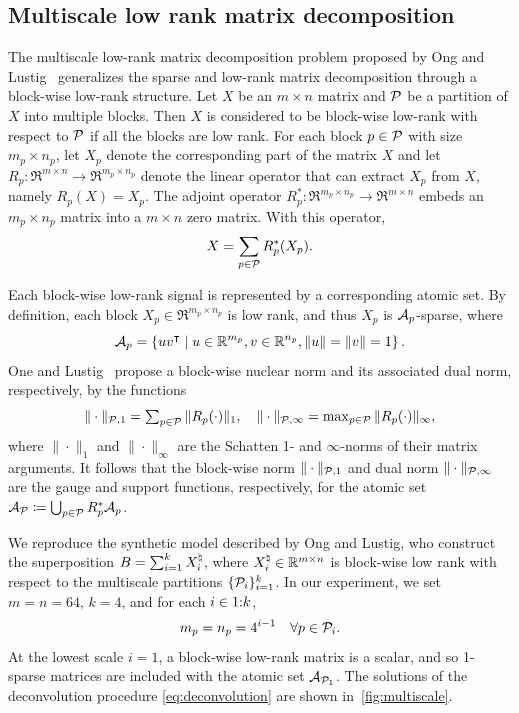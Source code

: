 \subsection{Multiscale low rank matrix decomposition} \label{sec:6.4}

The multiscale low-rank matrix decomposition problem proposed by Ong and Lustig~\cite{ong2016beyond} generalizes the sparse and low-rank matrix decomposition through a block-wise low-rank structure. Let $X$ be an $m \times n$ matrix and $\mathcal{P}$ be a partition of $X$ into multiple blocks. Then $X$ is considered to be block-wise low-rank with respect to $\mathcal{P}$ if all the blocks are low rank. For each block $p\in\mathcal{P}$ with size $m_p \times n_p$, let $X_p$ denote the corresponding part of the matrix $X$ and let $R_p: \Re^{m \times n} \to \Re^{m_p \times n_p}$ denote the linear operator that can extract $X_p$ from $X$, namely $R_p(X) = X_p$. The adjoint operator $R_p^*: \Re^{m_p \times n_p} \to \Re^{m \times n}$ embeds an $m_p \times n_p$ matrix into a $m \times n$ zero matrix. With this operator, 
\begin{equation*}
  X = \sum\limits_{p \in \mathcal{P}} R_p^*(X_p).
\end{equation*}

Each block-wise low-rank signal is represented by a corresponding atomic set. By definition, each block $X_p \in \Re^{m_p \times n_p}$ is low rank, and thus $X_p$ is $\mathcal{A}_p$-sparse, where 
\[
  \mathcal{A}_p = \left\{uv^\intercal \mid u \in \mathbb{R}^{m_p}, v \in \mathbb{R}^{n_p}, \|u\| = \|v\| = 1\right\}.
\]
One and Lustig~\cite{ong2016beyond} propose a block-wise nuclear norm and its associated dual norm, respectively, by the functions 
\[
  \|\cdot\|_{\mathcal{P},1} = \textstyle \sum_{p \in \mathcal{P}} \|R_p(\cdot)\|_1,
  \quad
  \|\cdot\|_{\mathcal{P},\infty} = \max_{p \in \mathcal{P}} \|R_p(\cdot)\|_{\infty},
\]
where $\|\cdot\|_1$ and $\|\cdot\|_\infty$ are the Schatten 1- and $\infty$-norms of their matrix arguments. It follows that the block-wise norm $\|\cdot\|_{\mathcal{P},1}$ and dual norm $\|\cdot\|_{\mathcal{P},\infty}$ are the gauge and support functions, respectively, for the atomic set $\mathcal{A}_{\mathcal{P}} \coloneqq  \bigcup_{p \in \mathcal{P}} R_p^*\mathcal{A}_p$.

We reproduce the synthetic model described by Ong and Lustig, who construct the superposition $B = \sum_{i = 1}^k X_i^{\natural}$,
where $X_i^{\natural} \in \mathbb{R}^{m \times n}$ is block-wise low rank with respect to the multiscale partitions $\{\mathcal{P}_i\}_{i = 1}^k$. In our experiment, we set $m = n = 64$, $k = 4$, and for each $i\in1\mathord{:}k$,
\[m_p = n_p = 4^{i-1}  \quad \forall p \in \mathcal{P}_i.\]
At the lowest scale $i=1$, a block-wise low-rank matrix is a scalar, and so 1-sparse matrices are included with the atomic set $\mathcal{A}_{\mathcal{P}_1}$.  The solutions of the deconvolution procedure \autoref{eq:deconvolution} are shown in~\autoref{fig:multiscale}.

